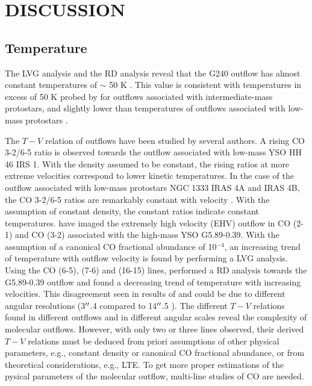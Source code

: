 \section{DISCUSSION}\label{discussion}

\subsection{Temperature}
The LVG analysis and the RD analysis reveal that the G240 outflow has almost constant temperatures of $\sim$ 50 K . This value is consistent with temperatures in excess of 50 K probed by \citet{2016A&A...587A..17V} for outflows associated with intermediate-mass protostars, and slightly lower than temperatures of outflows associated with low-mass protostars \citep{2009A&A...501..633V, 2012A&A...542A..86Y}.

The $T-V$ relation of outflows have been studied by several authors.  A rising CO 3-2/6-5 ratio is observed towards the outflow associated with low-mass YSO HH 46 IRS 1\citep{2009A&A...501..633V}. With the density assumed to be constant, the rising ratios at more extreme velocities correspond to lower kinetic temperatures. In the case of the outflow associated with low-mass protostars NGC 1333 IRAS 4A and  IRAS 4B, the CO 3-2/6-5 ratios are remarkably constant with velocity \citep{2012A&A...542A..86Y}. With the assumption of constant density, the constant ratios indicate constant temperatures. \citet{2012ApJ...744L..26S} have imaged the extremely high velocity (EHV) outflow in CO (2-1) and CO (3-2) associated with the high-mass YSO G5.89-0.39. With the assumption of a canonical CO fractional abundance of 10$^{-4}$, an increasing trend of temperature with outflow velocity is found by performing a LVG analysis. Using the CO (6-5), (7-6) and (16-15) lines, \citet{2015A&A...584A..70L} performed a RD analysis towards the G5.89-0.39 outflow and found a decreasing trend of temperature with increasing velocities. This disagreement seen in results of \citet{2012ApJ...744L..26S} and \citet{2015A&A...584A..70L} could be due to different angular resolutions (3${\mbox{$^{\prime\prime}$}}$.4 compared to 14${\mbox{$^{\prime\prime}$}}$.5 ). The different $T-V$ relations found in different outflows and in different angular scales reveal the complexity of molecular outflows. However, with only two or three lines observed, their derived $T-V$ relations must be deduced from priori assumptions of other physical parameters, e.g., constant density or canonical CO fractional abundance, or from theoretical considerations, e.g., LTE. To get more proper estimations of the pysical parameters of the molecular outflow, multi-line studies of CO are needed.

